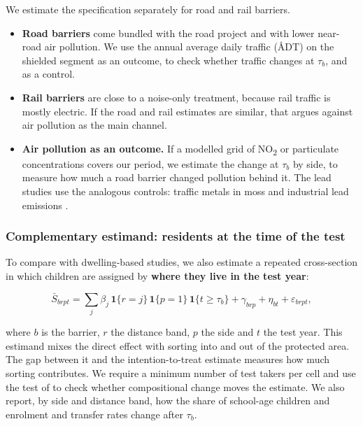 \documentclass[11pt]{article}
\begin{document}
We estimate the specification separately for road and rail barriers.

\begin{itemize}
\item \textbf{Road barriers} come bundled with the road project and with lower near-road air pollution. We use the annual average daily traffic (ÅDT) on the shielded segment as an outcome, to check whether traffic changes at \(\tau_b\), and as a control.
\item \textbf{Rail barriers} are close to a noise-only treatment, because rail traffic is mostly electric. If the road and rail estimates are similar, that argues against air pollution as the main channel.
\item \textbf{Air pollution as an outcome.} If a modelled grid of NO\textsubscript{2} or particulate concentrations covers our period, we estimate the change at \(\tau_b\) by side, to measure how much a road barrier changed pollution behind it. The lead studies use the analogous controls: traffic metals in moss \autocite{gronqvistUnderstandingHowLow2020} and industrial lead emissions \autocite{hollingsworthThousandCutsCumulative2025}.
\end{itemize}

\subsubsection{Complementary estimand: residents at the time of the test}

To compare with dwelling-based studies, we also estimate a repeated cross-section in which children are assigned by \textbf{where they live in the test year}:

\[
\bar S_{b r p t} = \sum_{j} \beta_j\, \mathbf{1}\{r = j\}\, \mathbf{1}\{p = 1\}\, \mathbf{1}\{t \ge \tau_b\} + \gamma_{b r p} + \eta_{b t} + \varepsilon_{b r p t},
\]

where \(b\) is the barrier, \(r\) the distance band, \(p\) the side and \(t\) the test year. This estimand mixes the direct effect with sorting into and out of the protected area. The gap between it and the intention-to-treat estimate measures how much sorting contributes. We require a minimum number of test takers per cell and use the test of \textcite{santannaDifferenceinDifferencesCompositionalChanges2025} to check whether compositional change moves the estimate. We also report, by side and distance band, how the share of school-age children and enrolment and transfer rates change after \(\tau_b\).
\end{document}
